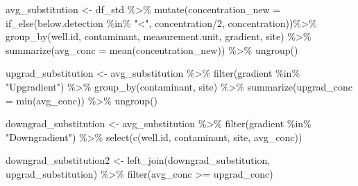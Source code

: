 \documentclass[12pt, twoside]{amherstthesis}
\newenvironment{Shaded}{\begin{snugshade}}{\end{snugshade}}
\newcommand{\AttributeTok}[1]{\textcolor[rgb]{0.77,0.63,0.00}{#1}}
\newcommand{\DecValTok}[1]{\textcolor[rgb]{0.00,0.00,0.81}{#1}}
\newcommand{\FunctionTok}[1]{\textcolor[rgb]{0.00,0.00,0.00}{#1}}
\newcommand{\NormalTok}[1]{#1}
\newcommand{\OtherTok}[1]{\textcolor[rgb]{0.56,0.35,0.01}{#1}}
\newcommand{\SpecialCharTok}[1]{\textcolor[rgb]{0.00,0.00,0.00}{#1}}
\newcommand{\StringTok}[1]{\textcolor[rgb]{0.31,0.60,0.02}{#1}}
\begin{document}
\begin{Shaded}
\begin{Highlighting}[]
\NormalTok{avg\_substitution }\OtherTok{\textless{}{-}}\NormalTok{ df\_std }\SpecialCharTok{\%\textgreater{}\%}
  \FunctionTok{mutate}\NormalTok{(}\AttributeTok{concentration\_new =} \FunctionTok{if\_else}\NormalTok{(below.detection }\SpecialCharTok{\%in\%} \StringTok{"\textless{}"}\NormalTok{, }
\NormalTok{                                     concentration}\SpecialCharTok{/}\DecValTok{2}\NormalTok{, concentration))}\SpecialCharTok{\%\textgreater{}\%}
  \FunctionTok{group\_by}\NormalTok{(well.id, contaminant, measurement.unit, gradient, site) }\SpecialCharTok{\%\textgreater{}\%}
  \FunctionTok{summarize}\NormalTok{(}\AttributeTok{avg\_conc =} \FunctionTok{mean}\NormalTok{(concentration\_new)) }\SpecialCharTok{\%\textgreater{}\%}
  \FunctionTok{ungroup}\NormalTok{()}

\NormalTok{upgrad\_substitution }\OtherTok{\textless{}{-}}\NormalTok{ avg\_substitution }\SpecialCharTok{\%\textgreater{}\%}
  \FunctionTok{filter}\NormalTok{(gradient }\SpecialCharTok{\%in\%} \StringTok{"Upgradient"}\NormalTok{) }\SpecialCharTok{\%\textgreater{}\%}
  \FunctionTok{group\_by}\NormalTok{(contaminant, site) }\SpecialCharTok{\%\textgreater{}\%}
  \FunctionTok{summarize}\NormalTok{(}\AttributeTok{upgrad\_conc =} \FunctionTok{min}\NormalTok{(avg\_conc)) }\SpecialCharTok{\%\textgreater{}\%}
  \FunctionTok{ungroup}\NormalTok{()}

\NormalTok{downgrad\_substitution }\OtherTok{\textless{}{-}}\NormalTok{ avg\_substitution }\SpecialCharTok{\%\textgreater{}\%}
  \FunctionTok{filter}\NormalTok{(gradient }\SpecialCharTok{\%in\%} \StringTok{"Downgradient"}\NormalTok{) }\SpecialCharTok{\%\textgreater{}\%}
  \FunctionTok{select}\NormalTok{(}\FunctionTok{c}\NormalTok{(well.id, contaminant, site, avg\_conc))}

\NormalTok{downgrad\_substitution2 }\OtherTok{\textless{}{-}} \FunctionTok{left\_join}\NormalTok{(downgrad\_substitution, upgrad\_substitution) }\SpecialCharTok{\%\textgreater{}\%}
  \FunctionTok{filter}\NormalTok{(avg\_conc }\SpecialCharTok{\textgreater{}=}\NormalTok{ upgrad\_conc) }


\end{Highlighting}
\end{Shaded}
\end{document}
